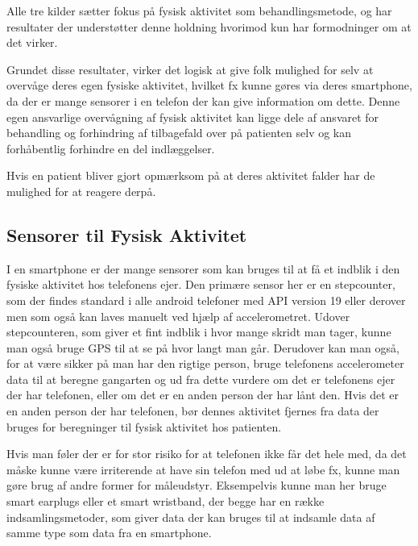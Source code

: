 Alle tre kilder sætter fokus på fysisk aktivitet som behandlingsmetode, \citet{art:physMental} og \citet{book:sportPsyc} har resultater der understøtter denne holdning hvorimod \citet{misc:healthReports} kun har formodninger om at det virker.

Grundet disse resultater, virker det logisk at give folk mulighed for selv at overvåge deres egen fysiske aktivitet, hvilket fx kunne gøres via deres smartphone, da der er mange sensorer i en telefon der kan give information om dette.
Denne egen ansvarlige overvågning af fysisk aktivitet kan ligge dele af ansvaret for behandling og forhindring af tilbagefald over på patienten selv og kan forhåbentlig forhindre en del indlæggelser.

Hvis en patient bliver gjort opmærksom på at deres aktivitet falder har de mulighed for at reagere derpå.

\subsection{Sensorer til Fysisk Aktivitet}
I en smartphone er der mange sensorer som kan bruges til at få et indblik i den fysiske aktivitet hos telefonens ejer.
Den primære sensor her er en stepcounter, som der findes standard i alle android telefoner med API version 19 eller derover men som også kan laves manuelt ved hjælp af accelerometret.
Udover stepcounteren, som giver et fint indblik i hvor mange skridt man tager, kunne man også bruge GPS til at se på hvor langt man går.
Derudover kan man også, for at være sikker på man har den rigtige person, bruge telefonens accelerometer data til at beregne gangarten \citep{4272626} og ud fra dette vurdere om det er telefonens ejer der har telefonen, eller om det er en anden person der har lånt den.
Hvis det er en anden person der har telefonen, bør dennes aktivitet fjernes fra data der bruges for beregninger til fysisk aktivitet hos patienten.

Hvis man føler der er for stor risiko for at telefonen ikke får det hele med, da det måske kunne være irriterende at have sin telefon med ud at løbe fx, kunne man gøre brug af andre former for måleudstyr.
Eksempelvis kunne man her bruge smart earplugs eller et smart wristband, der begge har en række indsamlingsmetoder, som giver data der kan bruges til at indsamle data af samme type som data fra en smartphone.
